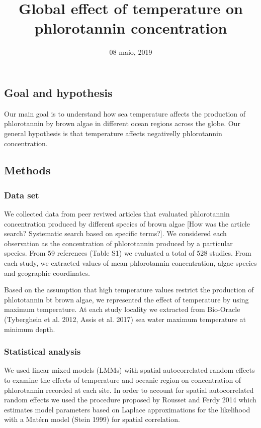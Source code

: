 \documentclass[]{article}
\title{Global effect of temperature on phlorotannin concentration}
\author{}
\date{08 maio, 2019}
\begin{document}
\maketitle

\subsection{Goal and hypothesis}\label{goal-and-hypothesis}

Our main goal is to understand how sea temperature affects the
production of phlorotannin by brown algae in different ocean regions
across the globe. Our general hypothesis is that temperature affects
negativelly phlorotannin concentration.

\subsection{Methods}\label{methods}

\subsubsection{Data set}\label{data-set}

We collected data from peer reviwed articles that evaluated phlorotannin
concentration produced by different species of brown algae {[}How was
the article search? Systematic search based on specific terms?{]}. We
considered each observation as the concentration of phlorotannin
produced by a particular species. From 59 references (Table S1) we
evaluated a total of 528 studies. From each study, we extracted values
of mean phlorotannin concentration, algae species and geographic
coordinates.

Based on the assumption that high temperature values restrict the
production of phlototannin bt brown algae, we represented the effect of
temperature by using maximum temperature. At each study locality we
extracted from Bio-Oracle (Tyberghein et al. 2012, Assis et al. 2017)
sea water maximum temperature at minimum depth.

\subsubsection{Statistical analysis}\label{statistical-analysis}

We used linear mixed models (LMMs) with spatial autocorrelated random
effects to examine the effects of temperature and oceanic region on
concentration of phlorotannin recorded at each site. In order to account
for spatial autocorrelated random effects we used the procedure proposed
by Rousset and Ferdy 2014 which estimates model parameters based on
Laplace approximations for the likelihood with a Matérn model (Stein
1999) for spatial correlation.
\end{document}
